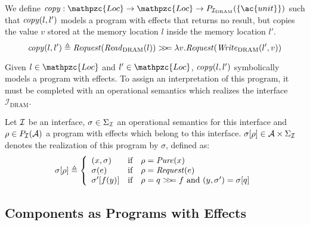 \begin{example}[Copy]
  We define
  $\func{copy} : \mathpzc{Loc} \rightarrow \mathpzc{Loc} \rightarrow
  P_{\I_{\mathrm{DRAM}}}(\{\ac{unit}\})$ such that $\mathit{copy}(l, l')$ models a
  program with effects that returns no result, but copies the value $v$ stored
  at the memory location $l$ inside the memory location $l'$.
  \[ \mathit{copy}(l, l') \triangleq
    \mathit{Request}(\mathit{Read}_{\mathrm{DRAM}}(l)) >\!\!>\!\!= \lambda
    v. \mathit{Request}(\mathit{Write}_{\mathrm{DRAM}}(l', v))
  \]
\end{example}

Given $l \in \mathpzc{Loc}$ and $l' \in \mathpzc{Loc}$, $\mathit{copy}(l, l')$
symbolically models a program with effects.
%
To assign an interpretation of this program, it must be completed with an
operational semantics which realizes the interface
$\mathcal{I}_{\mathrm{DRAM}}$.

\begin{definition}
  \label{def:freespec:realisation}

  Let $\mathcal{I}$ be an interface, $\sigma \in \Sigma_{\mathcal{I}}$ an operational semantics
  for this interface and $\rho \in P_{\mathcal{I}}(\mathcal{A})$ a program with effects
  which belong to this interface.
  $\sigma[\rho] \in \mathcal{A} \times \Sigma_{\mathcal{I}}$ denotes the realization of
  this program by $\sigma$, defined as:
  \[ \sigma[\rho] \triangleq \left\{
      \begin{array}{lcl} (x, \sigma) & \text{if} & \rho =
                                                   \mathit{Pure}(x) \\
        \sigma(e) & \text{if} & \rho =
                                \mathit{Request}(e) \\
        \sigma'[f(y)] & \text{if} & \rho =
                                    q >\!\!>\!\!= f\text{ and }(y, \sigma') = \sigma[q] \\
      \end{array}
    \right.
  \]
\end{definition}


\subsection{Components as Programs with Effects}

